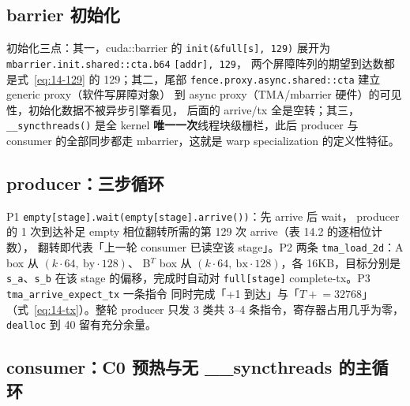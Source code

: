 \subsection{barrier 初始化}



初始化三点：其一，cuda::barrier 的 \texttt{init\allowbreak{}(\&full[s],\allowbreak{} 129)}
展开为 \texttt{mbarrier.\allowbreak{}init.\allowbreak{}shared::\allowbreak{}cta.\allowbreak{}b64}
\texttt{[addr], 129}，
两个屏障阵列的期望到达数都是式~\ref{eq:14-129} 的 129；其二，尾部
\texttt{fence.\allowbreak{}proxy.\allowbreak{}async.\allowbreak{}shared::\allowbreak{}cta} 建立 generic proxy（软件写屏障对象）
到 async proxy（TMA/mbarrier 硬件）的可见性，初始化数据不被异步引擎看见，
后面的 arrive/tx 全是空转；其三，\texttt{\_\allowbreak{}\_\allowbreak{}syncthreads\allowbreak{}()} 是全 kernel
\textbf{唯一一次}线程块级栅栏，此后 producer 与 consumer 的全部同步都走
mbarrier，这就是 warp specialization 的定义性特征。

\subsection{producer：三步循环}



P1 \texttt{empty[stage].\allowbreak{}wait\allowbreak{}(empty[stage].\allowbreak{}arrive\allowbreak{}())}：先 arrive 后 wait，
producer 的 1 次到达补足 empty 相位翻转所需的第 129 次 arrive（表 14.2 的逐相位计数），
翻转即代表「上一轮 consumer 已读空该 stage」。P2 两条
\texttt{tma\_load\_2d}：A box 从 $(k \cdot 64,\ \mathrm{by} \cdot 128)$、
B$^T$ box 从 $(k \cdot 64,\ \mathrm{bx} \cdot 128)$，各 16KB，目标分别是
\texttt{s\_a}、\texttt{s\_b} 在该 stage 的偏移，完成时自动对
\texttt{full[stage]} complete-tx。P3 \texttt{tma\_\allowbreak{}arrive\_\allowbreak{}expect\_\allowbreak{}tx} 一条指令
同时完成「+1 到达」与「$T \mathrel{+}= 32768$」（式~\ref{eq:14-tx}）。整轮
producer 只发 3 类共 3--4 条指令，寄存器占用几乎为零，\texttt{dealloc} 到 40
留有充分余量。

\subsection{consumer：C0 预热与无 \_\_syncthreads 的主循环}

